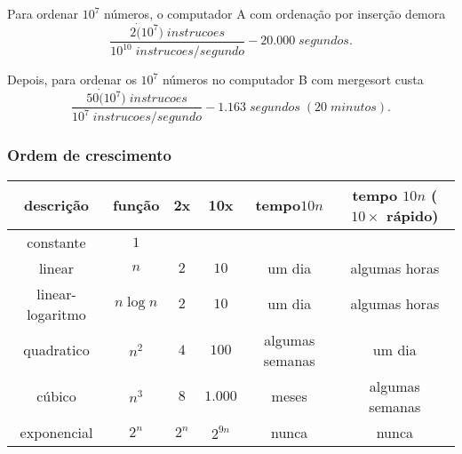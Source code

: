 Para ordenar $10^7$ números, o computador A com ordenação por inserção demora
\begin{equation*}
\frac{2\dot (10^7)\; instrucoes}{10^{10}\; instrucoes/segundo} - 20.000 \; segundos.
\end{equation*}

Depois, para ordenar os $10^7$ números no computador B com mergesort custa
\begin{equation*}
\frac{50 \dot (10^7)\; instrucoes}{10^{7}\; instrucoes/segundo} - 1.163 \; segundos \;(20\; minutos).
\end{equation*}

\subsubsection{Ordem de crescimento}

\begin{table}[ht]
\centering
\begin{tabular}{cccccc}
\hline
{\bf descrição} & {\bf função} & {\bf 2x} & {\bf 10x} & {\bf tempo$10n$} & {\bf tempo $10n$ ($10\times$ rápido)} \\ 
\hline
constante        & $1$ & & & &  \\
linear           & $n$        & $2$ & $10$ & um dia & algumas horas \\
linear-logaritmo & $n \log n$ & $2$ & $10$ & um dia & algumas horas \\
quadratico       & $n^2$      & $4$  & $100$ & algumas semanas & um dia  \\
cúbico           & $n^3$ & $8$ & $1.000$ & meses & algumas semanas  \\
exponencial      & $2^n$  & $2^n$ & $2^{9n}$ & nunca & nunca  \\
\hline
\end{tabular}
\end{table}

